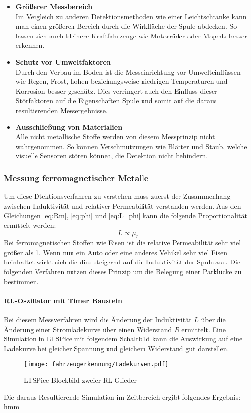 \begin{itemize}
    \item \textbf{Größerer Messbereich} \\
    Im Vergleich zu anderen Detektionsmethoden wie einer Leichtschranke kann man einen größeren Bereich durch die Wirkfläche
    der Spule abdecken. So lassen sich auch kleinere Kraftfahrzeuge wie Motorräder oder Mopeds besser erkennen.
    \item \textbf{Schutz vor Umweltfaktoren} \\
    Durch den Verbau im Boden ist die Messeinrichtung vor Umwelteinflüssen wie Regen, Frost, hohen beziehungsweise
    niedrigen Temperaturen und Korrosion besser geschütz. Dies verringert auch den Einfluss dieser Störfaktoren auf die Eigenschaften
    Spule und somit auf die daraus resultierenden Messergebnisse.
    \item \textbf{Ausschließung von Materialien} \\
    Alle nicht metallische Stoffe werden von diesem Messprinzip nicht wahrgenommen. So können Verschmutzungen wie Blätter und Staub, welche
    visuelle Sensoren stören können, die Detektion nicht behindern.
    
\end{itemize}
\subsubsection{Messung ferromagnetischer Metalle}
Um diese Dtektionsverfahren zu verstehen muss zuerst der Zusammenhang zwischen Induktivität und relativer Permeabilität verstanden werden.
Aus den Gleichungen \ref{eq:Rm}, \ref{eq:phi} und \ref{eq:L_phi} kann die folgende Proportionalität ermittelt werden:
\begin{equation} \label{iq:L_mu}
    L \propto \mu_{r}
\end{equation}
Bei ferromagnetischen Stoffen wie Eisen ist die relative Permeabilität sehr viel größer als 1. Wenn nun ein Auto oder 
eine anderes Vehikel sehr viel Eisen beinhaltet wirkt sich die dies steigernd auf die Induktivität der Spule aus. Die folgenden
Verfahren nutzen dieses Prinzip um die Belegung einer Parklücke zu bestimmen.

\paragraph{RL-Oszillator mit Timer Baustein}\mbox{}

Bei diesem Messverfahren wird die Änderung der Induktivität $L$ über die Änderung einer Stromladekurve über einen Widerstand
$R$ ermittelt. Eine Simulation in LTSPice mit folgendem Schaltbild kann die Auswirkung auf eine Ladekurve bei gleicher Spannung
und gleichem Widerstand gut darstellen.
\begin{figure}[H]
    \centering
    \texttt{[image: fahrzeugerkennung/Ladekurven.pdf]}
    \caption{LTSPice Blockbild zweier RL-Glieder}
\end{figure}
\pagebreak
Die daraus Resultierende Simulation im Zeitbereich ergibt folgendes Ergebnis:
hmm

